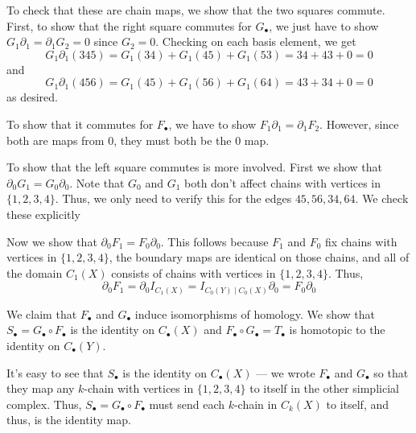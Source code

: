 \documentclass[12 pt, letterpaper]{hmcpset}
\begin{document}
\begin{solution}
	To check that these are chain maps, we show that the two squares commute. First, to show that the right square commutes for $G_{\bullet}$, we just have to show $G_{1} \partial_{1} = \partial_{1} G_{2} = 0$ since $G_{2} = 0$. Checking on each basis element, we get
	\[
		G_{1} \partial_{1}(345) = G_{1}(34) + G_{1}(45) + G_{1}(53) = 34 + 43 + 0 = 0
	\]
	and
	\[
		G_{1} \partial_{1}(456) = G_{1}(45) + G_{1}(56) + G_{1}(64) = 43 + 34 + 0 = 0
	\]
	as desired.

	To show that it commutes for $F_{\bullet}$, we have to show $F_{1} \partial_{1} = \partial_{1} F_{2}$. However, since both are maps from $0$, they must both be the $0$ map.

	To show that the left square commutes is more involved. First we show that $\partial_{0} G_{1} = G_{0} \partial_{0}$. Note that $G_{0}$ and $G_{1}$ both don't affect chains with vertices in $\{ 1, 2, 3, 4 \}$. Thus, we only need to verify this for the edges $45, 56, 34, 64$. We check these explicitly

	Now we show that $\partial_{0} F_{1} = F_{0} \partial_{0}$. This follows because $F_{1}$ and $F_{0}$ fix chains with vertices in $\{ 1, 2, 3, 4 \}$, the boundary maps are identical on those chains, and all of the domain $C_{1}(X)$ consists of chains with vertices in $\{ 1, 2, 3, 4 \}$. Thus,
	\[
		\partial_{0} F_{1} = \partial_{0} I_{C_{1}(X)} = I_{C_{0}(Y) \mid C_{0}(X)} \partial_{0} = F_{0} \partial_{0}
	\]

	We claim that $F_{\bullet}$ and $G_{\bullet}$ induce isomorphisms of homology. We show that $S_{\bullet} = G_{\bullet}  \circ F_{\bullet}$ is the identity on $C_{\bullet}(X)$ and $F_{\bullet} \circ G_{\bullet} = T_{\bullet}$ is homotopic to the identity on $C_{\bullet}(Y)$.

	It's easy to see that $S_{\bullet}$ is the identity on $C_{\bullet}(X)$ --- we wrote $F_{\bullet}$ and $G_{\bullet}$ so that they map any $k$-chain with vertices in $\{ 1, 2, 3, 4 \}$ to itself in the other simplicial complex. Thus, $S_{\bullet} = G_{\bullet} \circ F_{\bullet}$ must send each $k$-chain in $C_{k}(X)$ to itself, and thus, is the identity map.


\end{solution}
\end{document}
